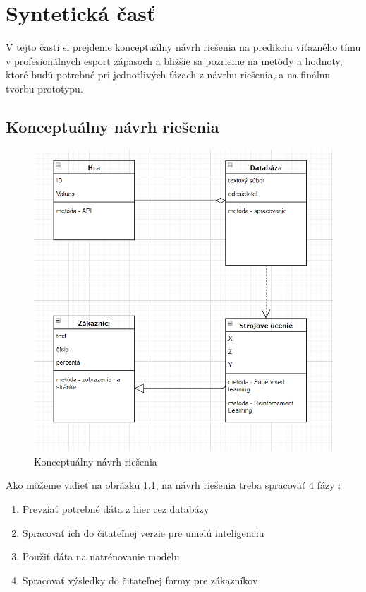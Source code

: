 
\chapter{Syntetická časť}
\label{methodology}
V tejto časti si prejdeme konceptuálny návrh riešenia na predikciu víťazného tímu v profesionálnych esport zápasoch a bližšie sa pozrieme na metódy a hodnoty, ktoré budú potrebné pri jednotlivých fázach z návrhu riešenia, a na finálnu tvorbu prototypu. 
\section{Konceptuálny návrh riešenia}

 \begin{figure}[ht!]
	
	\includegraphics[width=.9\textwidth]{figures/navrhriesenia}
	\centering
	\caption{ Konceptuálny návrh riešenia \label{koncept}}
	
\end{figure}

Ako môžeme vidieť na obrázku \ref{koncept}, na návrh riešenia treba spracovať 4 fázy : 

\begin{enumerate}
	\item Prevziať potrebné dáta z hier cez databázy
	\item Spracovať ich do čitateľnej verzie pre umelú inteligenciu
	\item Použiť dáta na natrénovanie modelu
	\item Spracovať výsledky do čitateľnej formy pre zákazníkov
\end{enumerate}

